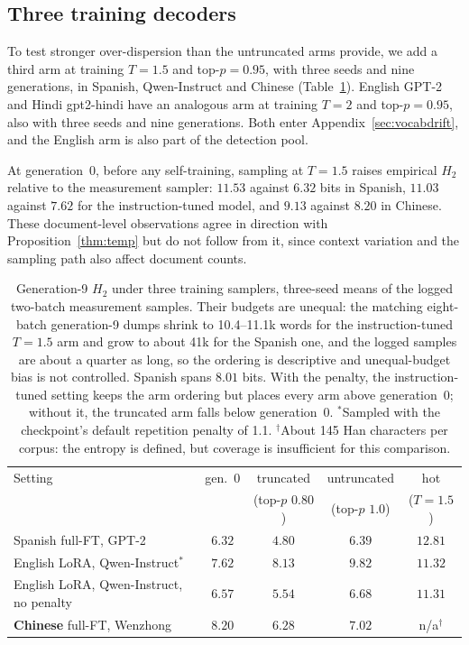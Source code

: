 \documentclass[10pt]{article}
\theoremstyle{plain}
\theoremstyle{definition}
\newcommand{\Htwo}{H_2}
\begin{document}
\subsection{Three training decoders}
\label{sec:threepoint}

To test stronger over-dispersion than the untruncated arms provide, we add a third arm at
training $T=1.5$ and top-$p=0.95$, with three seeds and nine generations, in Spanish,
Qwen-Instruct and Chinese (Table~\ref{tab:threepoint}). English GPT-2 and Hindi gpt2-hindi have
an analogous arm at training $T=2$ and top-$p=0.95$, also with three seeds and nine generations.
Both enter Appendix~\ref{sec:vocabdrift}, and the English arm is also part of the detection pool.

At generation~0, before any self-training, sampling at $T=1.5$ raises empirical $\Htwo$
relative to the measurement sampler: $11.53$ against $6.32$ bits in Spanish, $11.03$ against
$7.62$ for the instruction-tuned model, and $9.13$ against $8.20$ in Chinese. These
document-level observations agree in direction with Proposition~\ref{thm:temp} but do not follow from
it, since context variation and the sampling path also affect document counts.

\begin{table}[ht]
\centering\small
\caption{Generation-9 $\Htwo$ under three training samplers, three-seed means of the logged two-batch
measurement samples. Their budgets are unequal: the matching eight-batch generation-9 dumps
shrink to 10.4--11.1k words for the instruction-tuned $T=1.5$ arm and grow to about 41k for the
Spanish one, and the logged samples are about a quarter as long, so the ordering is descriptive
and unequal-budget bias is not controlled. Spanish spans $8.01$ bits. With the
penalty, the instruction-tuned setting keeps the arm ordering but places every arm above
generation~0; without it, the truncated arm falls below generation~0.
$^\ast$Sampled with the checkpoint's default repetition penalty of 1.1. $^{\dagger}$About 145 Han
characters per corpus: the entropy is defined, but coverage is insufficient for this
comparison.}
\label{tab:threepoint}
\begin{tabular}{lcccc}
\toprule
Setting & gen.~0 & truncated & untruncated & hot \\
 & & (top-$p$ $0.80$) & (top-$p$ $1.0$) & ($T{=}1.5$) \\
\midrule
Spanish full-FT, GPT-2 & $6.32$ & $4.80$ & $6.39$ & $12.81$ \\
English LoRA, Qwen-Instruct$^\ast$ & $7.62$ & $8.13$ & $9.82$ & $11.32$ \\
English LoRA, Qwen-Instruct, no penalty & $6.57$ & $5.54$ & $6.68$ & $11.31$ \\
\textbf{Chinese} full-FT, Wenzhong & $8.20$ & $6.28$ & $7.02$ & n/a$^{\dagger}$ \\
\bottomrule
\end{tabular}
\end{table}
\end{document}
